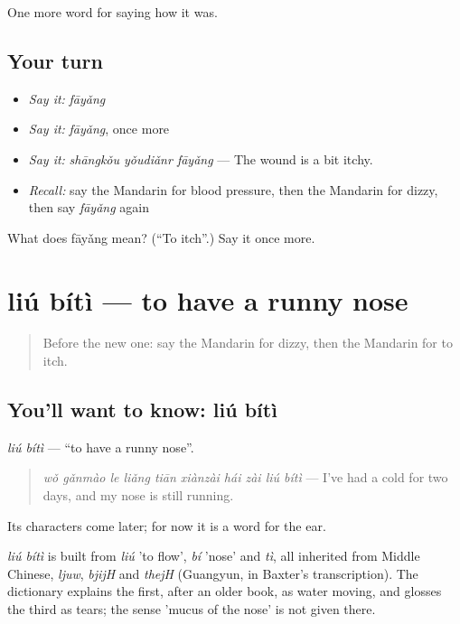 \begin{grammarlens}[title={What you've built}]
One more word for saying how it was.
\end{grammarlens}

\subsection*{Your turn}
\begin{itemize}
\raggedright
  \item \emph{Say it:} \emph{fāyǎng}
  \item \emph{Say it:} \emph{fāyǎng}, once more
  \item \emph{Say it:} \emph{shāngkǒu yǒudiǎnr fāyǎng} — The wound is a bit itchy.
  \item \emph{Recall:} say the Mandarin for blood pressure, then the Mandarin for dizzy, then say \emph{fāyǎng} again
\end{itemize}

\begin{tcolorbox}[breakable,colback=teal!4,colframe=teal!35!black,title={Before you move on}]
What does fāyǎng mean? (\textquotedblleft{}To itch\textquotedblright{}.) Say it once more.
\end{tcolorbox}
\section[liú bítì]{liú bítì — to have a runny nose}

\label{lesson:ZH-C480-liubiti}



\begin{quote}
Before the new one: say the Mandarin for dizzy, then the Mandarin for to itch.
\end{quote}

\subsection*{You'll want to know: liú bítì}
\emph{liú bítì} — \textquotedblleft{}to have a runny nose\textquotedblright{}.

\begin{quote}
\emph{wǒ gǎnmào le liǎng tiān xiànzài hái zài liú bítì} — I've had a cold for two days, and my nose is still running.
\end{quote}

Its characters come later; for now it is a word for the ear.

\begin{cousinweb}
\emph{liú bítì} is built from \emph{liú} 'to flow', \emph{bí} 'nose' and \emph{tì}, all inherited from Middle Chinese, \emph{ljuw}, \emph{bjijH} and \emph{thejH} (Guangyun, in Baxter's transcription). The dictionary explains the first, after an older book, as water moving, and glosses the third as tears; the sense 'mucus of the nose' is not given there.
\end{cousinweb}

